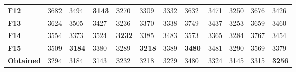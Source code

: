 \documentclass[runningheads]{llncs}
\begin{document}
\begin{table}[bt]
\begin{center}
\begin{tabular}{|l|l|l|l|l|l|l|l|l|l|l|l|}
      \textbf{F12}         & 3682                           & 3494                           & \textbf{3143} & 3270 & 3309                           & 3332                           & 3632                           & 3471 & 3250                           & 3676 & 3426 \\
      \textbf{F13}         & 3624                           & 3505                           & 3427                           & 3236 & 3370                           & 3338                           & 3749                           & 3437 & 3253                           & 3659 & 3460 \\
      \textbf{F14}         & 3554                           & 3373                           & 3524                           & \textbf{3232} & 3385                           & 3483                           & 3573                           & 3365 & 3284                           & 3767 & 3454 \\
      \textbf{F15}         & 3509                           & \textbf{3184} & 3380                           & 3289 & \textbf{3218} & 3389                           & \textbf{3480} & 3481 & 3290                           & 3569 & 3379 \\ \hline
      \textbf{Obtained} & 3294                           & 3184 & 3143                           & 3232 & 3218 & 3229                           & 3480 & 3324 & 3145                           & 3315 & \textbf{3256} \\
\hline
      \end{tabular}
  \end{center}
\end{table}
\end{document}
